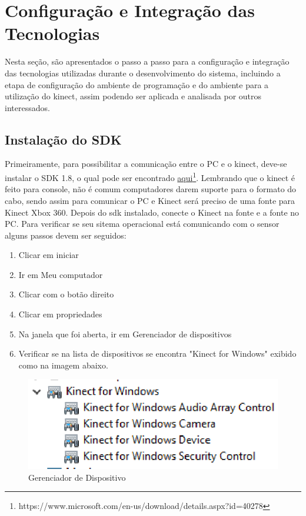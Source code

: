 \section{Configuração e Integração das Tecnologias}
Nesta seção, são apresentados o passo a passo para a configuração e integração das tecnologias utilizadas durante o desenvolvimento do sistema,
incluindo a etapa de configuração do ambiente de programação e
do ambiente para a utilização do kinect, assim podendo ser aplicada e analisada por outros interessados.

\subsection{Instalação do SDK}
  Primeiramente, para possibilitar a comunicação entre o PC e o kinect, deve-se
instalar o SDK 1.8, o qual pode ser encontrado \href{https://www.microsoft.com/en-us/download/details.aspx?id=40278}{aqui}\footnote{https://www.microsoft.com/en-us/download/details.aspx?id=40278}.
  Lembrando que o kinect é feito para console, não é comum computadores darem suporte para o formato do
cabo, sendo assim para comunicar o PC e Kinect será preciso de uma fonte para Kinect Xbox 360.
  Depois do sdk instalado, conecte o Kinect na fonte e a fonte no PC. Para verificar se seu sitema operacional
está comunicando com o sensor alguns passos devem ser seguidos:

\begin{enumerate}
  \item Clicar em iniciar
  \item Ir em Meu computador
  \item Clicar com o botão direito
  \item Clicar em propriedades
  \item Na janela que foi aberta, ir em Gerenciador de dispositivos
  \item Verificar se na lista de dispositivos se encontra "Kinect for Windows" exibido como na imagem abaixo.
\end{enumerate}


\begin{figure}[H]
\centering
\includegraphics [keepaspectratio=true,scale=0.60]{figuras/gerenciadorDispositivo.eps}

\caption{Gerenciador de Dispositivo}
\label{gerenciadorDispositivo}
\end{figure}

